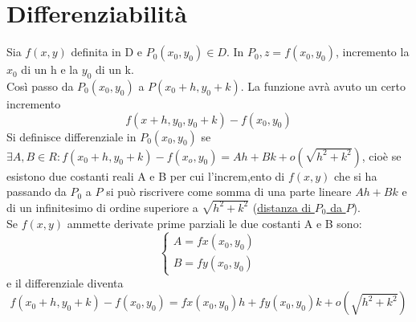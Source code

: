 \chapter{Differenziabilità}
\begin{defi}
  Sia $f(x,y)$ definita in D e $P_0(x_0,y_0)\in D$. In $P_0, z=f(x_0,y_0)$, incremento la $x_0$
  di un h e la $y_0$ di un k.\\
  Così passo da $P_0(x_0,y_0)$ a $P(x_0+h,y_0+k)$. La funzione avrà avuto un certo incremento
  \begin{equation*}
    f(x+h,y_0,y_0+k)-f(x_0,y_0)
  \end{equation*}
  Si definisce {\color{red}differenziale} in $P_0(x_0,y_0)$ se
  $\exists A,B \in R: f(x_0+h,y_0+k)-f(x_o,y_0)=Ah+Bk+o(\sqrt{h^2+k^2})$, cioè se esistono
  due costanti reali A e B per cui l'increm,ento di $f(x,y)$ che si ha passando da $P_0$ a $P$
  si può riscrivere come somma di una parte lineare $Ah+Bk$ e di un infinitesimo di ordine
  superiore a $\sqrt{h^2+k^2}$ (\underline{distanza di $P_0$ da $P$}).\\
  Se $f(x,y)$ ammette derivate prime parziali le due costanti A e B sono:
  \begin{equation*}
    \begin{cases}
      A=fx(x_0,y_0)\\
      B=fy(x_0,y_0)
    \end{cases}
  \end{equation*}
  e il differenziale diventa
  \begin{equation}
    f(x_0+h,y_0+k) - f(x_0,y_0)=fx(x_0,y_0)h+fy(x_0,y_0)k+o(\sqrt{h^2+k^2})
  \end{equation}
\end{defi}
